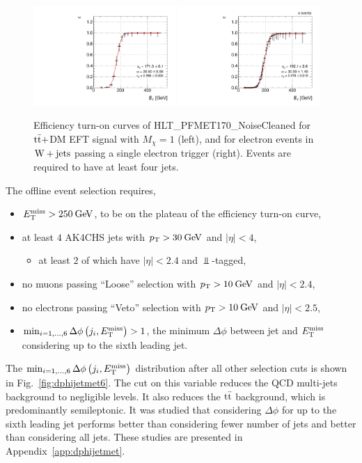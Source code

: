 \begin{figure}[htbp]
  \centering
  \includegraphics[width=0.48\textwidth]{figures/ttdm1-meteff.pdf}
  \includegraphics[width=0.48\textwidth]{figures/wjets-e-meteff.pdf}
  \caption{Efficiency turn-on curves of HLT\_PFMET170\_NoiseCleaned for $\mathrm{t}\bar{\mathrm{t}}+$DM EFT signal with $M_{\chi}=1$ (left), and for electron events in $\mathrm{W+jets}$ passing a single electron trigger (right). Events are required to have at least four jets.}
  \label{fig:meteff_1}
\end{figure}

The offline event selection requires,
\begin{itemize}
\item $E_\mathrm{T}^{\mathrm{miss}} > 250\:\mathrm{Ge\kern -0.1em V}$, to be on the plateau of the efficiency turn-on curve,
\item at least $4$ AK4CHS jets with $p_\mathrm{T}>30\:\mathrm{Ge\kern -0.1em V}$ and $|\eta|<4$,
  \begin{itemize}
  \item at least $2$ of which have $|\eta|<2.4$ and $\Bot$-tagged,
  \end{itemize}
\item no muons passing ``Loose'' selection with $p_\mathrm{T}>10\:\mathrm{Ge\kern -0.1em V}$ and $|\eta|<2.4$,
\item no electrons passing ``Veto'' selection with $p_\mathrm{T}>10\:\mathrm{Ge\kern -0.1em V}$ and $|\eta|<2.5$,
\item $\min_{i=1,\ldots,6}\Delta\phi\left(j_i,E_\mathrm{T}^{\mathrm{miss}}\right)>1$, the minimum $\Delta\phi$ between jet and $E_\mathrm{T}^{\mathrm{miss}}$ considering up to the sixth leading jet.
\end{itemize}

The $\min_{i=1,\ldots,6}\Delta\phi\left(j_i,E_\mathrm{T}^{\mathrm{miss}}\right)$ distribution after all other selection cuts is shown in Fig.~\ref{fig:dphijetmet6}. The cut on this variable reduces the QCD multi-jets background to negligible levels. It also reduces the $\mathrm{t}\bar{\mathrm{t}}$ background, which is predominantly semileptonic.%
It was studied that considering $\Delta\phi$ for up to the sixth leading jet performs better than considering fewer number of jets and better than considering all jets. These studies are presented in Appendix~\ref{app:dphijetmet}.

